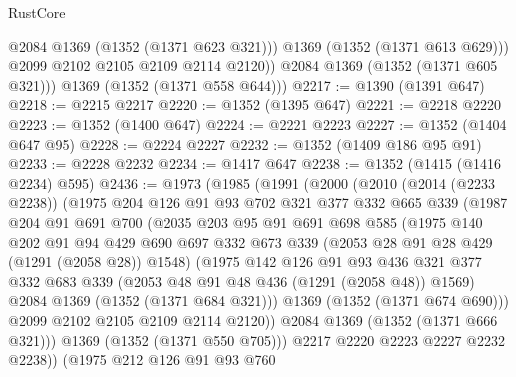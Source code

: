 \begin{lexlean}{RustCore}
\begin{coremodule}
                @2084
                @1369
                (@1352 (@1371 @623 @321)))
              @1369
              (@1352 (@1371 @613 @629)))
            @2099
            @2102
            @2105
            @2109
            @2114
            @2120))
        @2084
        @1369
        (@1352 (@1371 @605 @321)))
      @1369
      (@1352 (@1371 @558 @644)))
@2217 := @1390 (@1391 @647)
@2218 := @2215 @2217
@2220 := @1352 (@1395 @647)
@2221 := @2218 @2220
@2223 := @1352 (@1400 @647)
@2224 := @2221 @2223
@2227 := @1352 (@1404 @647 @95)
@2228 := @2224 @2227
@2232 := @1352 (@1409 @186 @95 @91)
@2233 := @2228 @2232
@2234 := @1417 @647
@2238 := @1352 (@1415 (@1416 @2234) @595)
@2436 := @1973
    (@1985
      (@1991
        (@2000
          (@2010
            (@2014 (@2233 @2238))
            (@1975
              @204
              @126
              @91
              @93
              @702
              @321
              @377
              @332
              @665
              @339
              (@1987
                @204
                @91
                @691
                @700
                (@2035
                  @203
                  @95
                  @91
                  @691
                  @698
                  @585
                  (@1975
                    @140
                    @202
                    @91
                    @94
                    @429
                    @690
                    @697
                    @332
                    @673
                    @339
                    (@2053 @28 @91 @28 @429 (@1291 (@2058 @28)) @1548)
                    (@1975
                      @142
                      @126
                      @91
                      @93
                      @436
                      @321
                      @377
                      @332
                      @683
                      @339
                      (@2053 @48 @91 @48 @436 (@1291 (@2058 @48)) @1569)
                      @2084
                      @1369
                      (@1352 (@1371 @684 @321)))
                    @1369
                    (@1352 (@1371 @674 @690)))
                  @2099
                  @2102
                  @2105
                  @2109
                  @2114
                  @2120))
              @2084
              @1369
              (@1352 (@1371 @666 @321)))
            @1369
            (@1352 (@1371 @550 @705)))
          @2217
          @2220
          @2223
          @2227
          @2232
          @2238))
      (@1975
        @212
        @126
        @91
        @93
        @760

\end{coremodule}
\end{lexlean}
